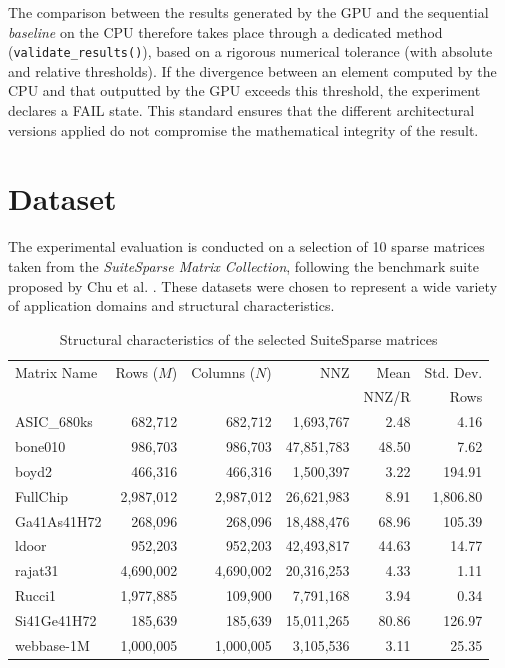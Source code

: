 \documentclass[conference]{IEEEtran}
\begin{document}
The comparison between the results generated by the GPU and the sequential \textit{baseline} on the CPU therefore takes place through a dedicated method (\texttt{validate\_results()}), based on a rigorous numerical tolerance (with absolute and relative thresholds). If the divergence between an element computed by the CPU and that outputted by the GPU exceeds this threshold, the experiment declares a FAIL state. This standard ensures that the different architectural versions applied do not compromise the mathematical integrity of the result.
\section{Dataset}
The experimental evaluation is conducted on a selection of 10 sparse matrices taken from the \textit{SuiteSparse Matrix Collection}, following the benchmark suite proposed by Chu et al. \cite{bChu2023}.
These datasets were chosen to represent a wide variety of application domains and structural characteristics.

\begin{table}[htbp]
\caption{Structural characteristics of the selected SuiteSparse matrices}
\begin{center}
\footnotesize
\setlength{\tabcolsep}{3pt} 
\begin{tabular}{|l|r|r|r|r|r|}
\hline
Matrix Name & Rows ($M$) & Columns ($N$) & NNZ & Mean & Std. Dev. \\
& & & & NNZ/R & Rows \\
\hline
ASIC\_680ks     & 682,712    & 682,712    & 1,693,767  & 2.48  & 4.16    \\
bone010         & 986,703    & 986,703    & 47,851,783 & 48.50 & 7.62    \\
boyd2           & 466,316    & 466,316    & 1,500,397  & 3.22  & 194.91  \\
FullChip        & 2,987,012  & 2,987,012  & 26,621,983 & 8.91  & 1,806.80 \\
Ga41As41H72     & 268,096    & 268,096    & 18,488,476 & 68.96 & 105.39  \\
ldoor           & 952,203    & 952,203    & 42,493,817 & 44.63 & 14.77   \\
rajat31         & 4,690,002  & 4,690,002  & 20,316,253 & 4.33  & 1.11    \\
Rucci1          & 1,977,885  & 109,900    & 7,791,168  & 3.94  & 0.34    \\
Si41Ge41H72     & 185,639    & 185,639    & 15,011,265 & 80.86 & 126.97  \\
webbase-1M      & 1,000,005  & 1,000,005  & 3,105,536  & 3.11  & 25.35   \\
\hline
\end{tabular}
\label{tab:datasets}
\end{center}
\end{table}
\end{document}
